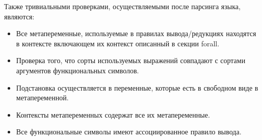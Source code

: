 Также тривиальными проверками, осуществляемыми после парсинга языка, являются:
\begin{itemize}
\item Все метапеременные, используемые в правилах вывода/редукциях находятся в контексте включающем их контекст описанный в секции forall.
\item Проверка того, что сорты используемых выражений совпадают с сортами аргументов функциональных символов.
\item Подстановка осуществляется в переменные, которые есть в свободном виде в метапеременной.
\item Контексты метапеременных содержат все их метапеременные.
\item Все функциональные символы имеют ассоциированное правило вывода.
\end{itemize}
